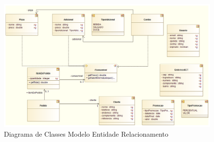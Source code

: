 \begin{landscape}
\begin{figure}[h!]
 \centering
 \includegraphics[scale=0.5]{capitulo02/diagramaClassesMER.png}
 \caption{Diagrama de Classes Modelo Entidade Relacionamento}
\end{figure}
\end{landscape}

